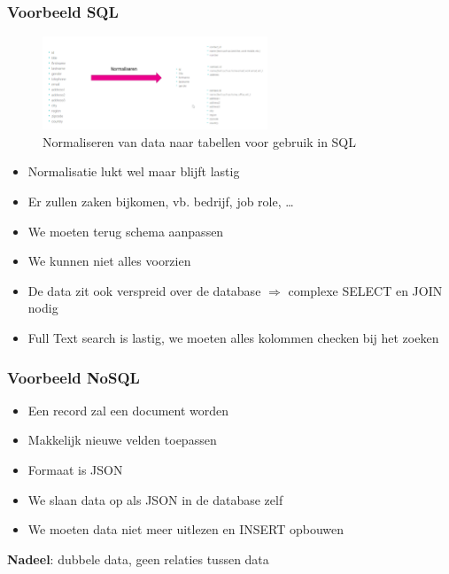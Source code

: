\documentclass{article}
\newcommand{\bold}[1]{\textbf{#1}}
\begin{document}
\subsubsection{Voorbeeld SQL}

\begin{figure}[H]
    \centering
    \includegraphics[width=0.6\textwidth]{sql-normaliseren.png}
    \caption{Normaliseren van data naar tabellen voor gebruik in SQL}
\end{figure}

\begin{itemize}
    \item Normalisatie lukt wel maar blijft lastig
    \item Er zullen zaken bijkomen, vb. bedrijf, job role, \dots
    \item We moeten terug schema aanpassen
    \item We kunnen niet alles voorzien
    \item De data zit ook verspreid over de database $\Rightarrow$ complexe SELECT en JOIN nodig
    \item Full Text search is lastig, we moeten alles kolommen checken bij het zoeken
\end{itemize}

\subsubsection{Voorbeeld NoSQL}

\begin{itemize}
    \item Een record zal een document worden
    \item Makkelijk nieuwe velden toepassen
    \item Formaat is JSON
    \item We slaan data op als JSON in de database zelf
    \item We moeten data niet meer uitlezen en INSERT opbouwen
\end{itemize}

\bold{Nadeel}: dubbele data, geen relaties tussen data
\end{document}
